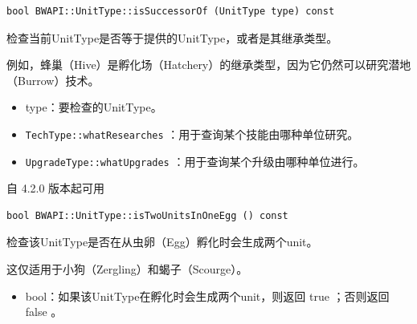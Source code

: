 \begin{tcolorbox}[colback=white, colframe=black!60!white, title=isSuccessorOf(), arc=0mm]
    \begin{verbatim}
bool BWAPI::UnitType::isSuccessorOf (UnitType type) const
    \end{verbatim}
    检查当前UnitType是否等于提供的UnitType，或者是其继承类型。
    \par 例如，蜂巢（Hive）是孵化场（Hatchery）的继承类型，因为它仍然可以研究潜地（Burrow）技术。
\begin{parameter}
    \begin{itemize}
        \item type：要检查的UnitType。
    \end{itemize}
\end{parameter}
\begin{refer}
    \begin{itemize}
        \item \verb|TechType::whatResearches|  ：用于查询某个技能由哪种单位研究。
        \item \verb|UpgradeType::whatUpgrades|  ：用于查询某个升级由哪种单位进行。
    \end{itemize}
\end{refer}
自 4.2.0 版本起可用
\end{tcolorbox}


\begin{tcolorbox}[colback=white, colframe=black!60!white, title=isTwoUnitsInOneEgg(), arc=0mm]
    \begin{verbatim}
bool BWAPI::UnitType::isTwoUnitsInOneEgg () const
    \end{verbatim}
    检查该UnitType是否在从虫卵（Egg）孵化时会生成两个unit。\par 这仅适用于小狗（Zergling）和蝎子（Scourge）。
\begin{return}
\begin{itemize}
    \item bool：如果该UnitType在孵化时会生成两个unit，则返回   true  ；否则返回   false  。
\end{itemize}
\end{return}
\end{tcolorbox}


